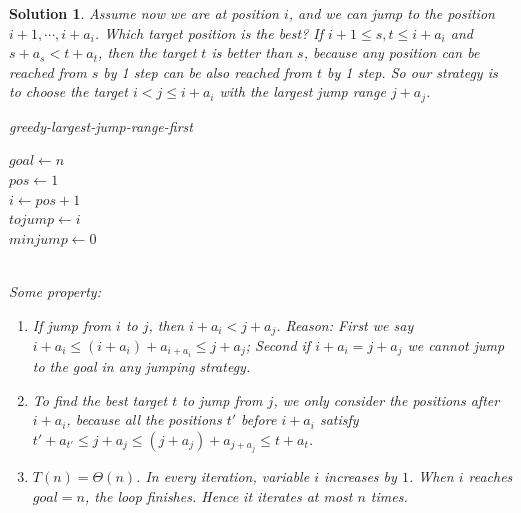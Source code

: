 \documentclass{article}
\newtheorem*{solution}{Solution}
\begin{document}
\begin{enumerate}
\begin{solution}
    Assume now we are at position $i$, and we can jump to the position $i+1, \cdots, i+a_i$. Which target position is the best? If $i+1\leq s, t\leq i+a_i$ and $s+a_s < t+a_t$, then the target $t$ is better than $s$, because any position can be reached from $s$ by 1 step can be also reached from $t$ by 1 step. So our strategy is to choose the target $i<j\leq i+a_i$ with the largest jump range $j+a_j$.\\
    \begin{minipage}[htb]{0.8\textwidth}
        \begin{algorithm}[H]
            \caption{greedy-largest-jump-range-first}
            \label{Alg-jump}
            \BlankLine
            $goal \leftarrow n$\\
            $pos \leftarrow 1$\\
            $i \leftarrow pos + 1$\\
            $tojump \leftarrow i$\\
            $minjump \leftarrow 0$\\
        \end{algorithm}
    \end{minipage}\\
    Some property: 
    \begin{enumerate}
        \item If jump from $i$ to $j$, then $i+a_i < j+a_j$. Reason: First we say $i+a_i \leq (i+a_i)+a_{i+a_i}\leq j+a_j$; Second if $i+a_i = j+a_j$ we cannot jump to the goal in any jumping strategy.
        \item To find the best target $t$ to jump from $j$, we only consider the positions after $i+a_i$, because all the positions $t'$ before $i+a_i$ satisfy $t'+a_{t'} \leq j+a_j \leq (j+a_j)+a_{j+a_j}\leq t+a_t$.
        \item $T(n)=\Theta(n)$. In every iteration, variable $i$ increases by $1$. When $i$ reaches $goal=n$, the loop finishes. Hence it iterates at most $n$ times.
    \end{enumerate}
    
\end{solution}


\end{enumerate}
\end{document}
